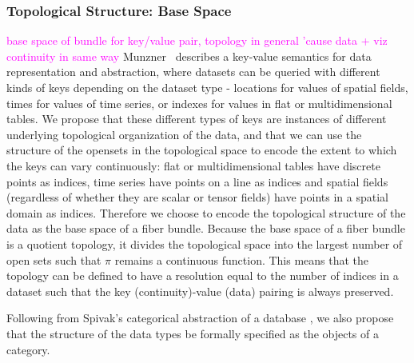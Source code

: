 \documentclass[journal]{IEEEtran}
\newcommand{\note}[1]{\textcolor{magenta}{#1}}
\theoremstyle{definition}
\theoremstyle{remark}
\begin{document}
\subsubsection{Topological Structure: Base Space \dbase}
\label{sec:atct:fb:base}
\note{base space of bundle for key/value pair, topology in general 'cause data + viz continuity in same way}
Munzner~\cite{munznerChDataAbstraction} describes a key-value semantics for data representation and abstraction, where datasets can be queried with different kinds of keys depending on the dataset type - locations for values of spatial fields, times for values of time series, or indexes for values in flat or multidimensional tables.
We propose that these different types of keys are instances of different underlying topological organization of the data, and that we can use the structure of the opensets in the topological space to encode the extent to which the keys can vary continuously: flat or multidimensional tables have discrete points as indices, time series have points on a line as indices and spatial fields (regardless of whether they are scalar or tensor fields) have points in a spatial domain as indices. Therefore we choose to encode the topological structure of the data as the \textcolor{base}{base space} of a fiber bundle. Because the base space of a fiber bundle is a quotient topology\cite{munkresElementsAlgebraicTopology1984}, it divides the topological space into the largest number of open sets such that $\pi$ remains a continuous function. This means that the topology can be defined to have a resolution equal to the number of indices in a dataset such that the key (continuity)-value (data) pairing is always preserved.

Following from Spivak's categorical abstraction of a database \cite{spivakSimplicialDatabases2009,spivakDatabasesAreCategories2010}, we also propose that the structure of the data types be formally specified as the objects of a category.
\end{document}
